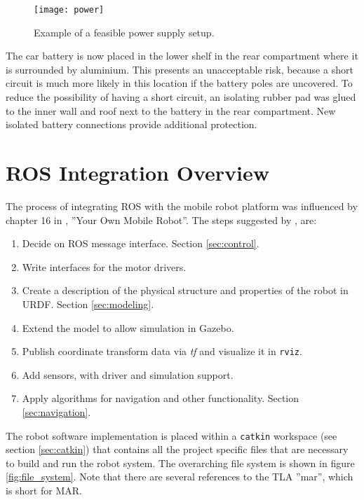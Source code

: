\begin{figure}[h]
	\centering
	\texttt{[image: power]}
	\caption{Example of a feasible power supply setup.}
	\label{fig:power}
\end{figure}

The car battery is now placed in the lower shelf in the rear compartment where it is surrounded by aluminium. This presents an unacceptable risk, because a short circuit is much more likely in this location if the battery poles are uncovered. To reduce the possibility of having a short circuit, an isolating rubber pad was glued to the inner wall and roof next to the battery in the rear compartment. New isolated battery connections provide additional protection. 

\section{ROS Integration Overview}
\label{sec:integration}

The process of integrating \ac{ROS} with the mobile robot platform was influenced by chapter 16 in \cite{rosbook15}, ''Your Own Mobile Robot''. The steps suggested by \cite{rosbook15},  are:

\begin{enumerate}
	
	\item Decide on ROS message interface. Section \ref{sec:control}.
	\item Write interfaces for the motor drivers.
	\item Create a description of the physical structure and properties of the robot in \ac{URDF}. Section \ref{sec:modeling}.
	\item Extend the model to allow simulation in Gazebo.
	\item Publish coordinate transform data via \textit{tf} and visualize it in \texttt{rviz}.
	\item Add sensors, with driver and simulation support.
	\item Apply algorithms for navigation and other functionality. Section \ref{sec:navigation}.
\end{enumerate}



The robot software implementation is placed within a \texttt{catkin} workspace (see section \ref{sec:catkin}) that contains all the project specific files that are necessary to build and run the robot system. The overarching file system is shown in figure \ref{fig:file_system}. Note that there are several references to the \ac{TLA} ''mar'', which is short for \ac{MAR}.

